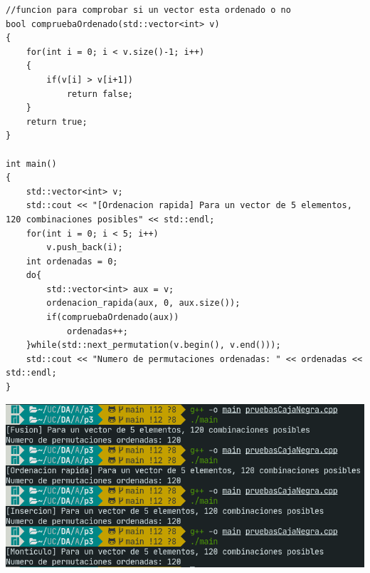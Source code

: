 \begin{lstlisting}
//funcion para comprobar si un vector esta ordenado o no
bool compruebaOrdenado(std::vector<int> v)
{
    for(int i = 0; i < v.size()-1; i++)
    {
        if(v[i] > v[i+1])
            return false;
    }
    return true;
}

int main()
{
    std::vector<int> v;
    std::cout << "[Ordenacion rapida] Para un vector de 5 elementos, 120 combinaciones posibles" << std::endl; 
    for(int i = 0; i < 5; i++)
        v.push_back(i);
    int ordenadas = 0;
    do{
        std::vector<int> aux = v;
        ordenacion_rapida(aux, 0, aux.size());
        if(compruebaOrdenado(aux))
            ordenadas++;
    }while(std::next_permutation(v.begin(), v.end()));
    std::cout << "Numero de permutaciones ordenadas: " << ordenadas << std::endl; 
}
\end{lstlisting}

\includegraphics[scale=0.6]{DA.png} 